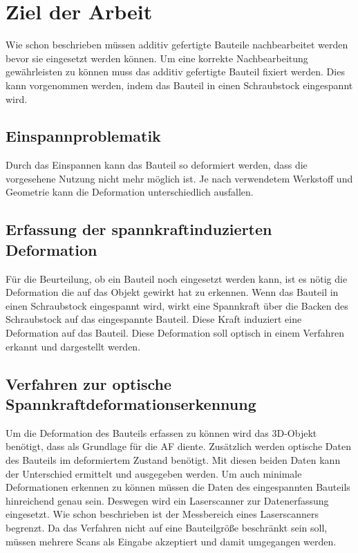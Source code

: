 

\chapter{Ziel der Arbeit}

Wie schon beschrieben müssen additiv gefertigte Bauteile nachbearbeitet werden
bevor sie eingesetzt werden können. 
Um eine korrekte Nachbearbeitung gewährleisten zu können muss das additiv 
gefertigte Bauteil fixiert werden. 
Dies kann vorgenommen werden, indem das Bauteil in einen Schraubstock eingespannt wird.

\section{Einspannproblematik}

Durch das Einspannen kann das Bauteil so deformiert werden, dass die vorgesehene Nutzung nicht mehr möglich ist. 
Je nach verwendetem Werkstoff und Geometrie kann die Deformation unterschiedlich
ausfallen. 

\section{Erfassung der spannkraftinduzierten Deformation}

Für die Beurteilung, ob ein Bauteil noch eingesetzt werden kann, ist es nötig die 
Deformation die auf das Objekt gewirkt hat zu erkennen. Wenn das Bauteil in einen 
Schraubstock eingespannt wird, wirkt eine Spannkraft über die Backen des Schraubstock
auf das eingespannte Bauteil. 
Diese Kraft induziert eine Deformation auf das Bauteil. Diese Deformation soll 
optisch in einem Verfahren erkannt und dargestellt werden.

\section{Verfahren zur optische Spannkraftdeformationserkennung}

Um die Deformation des Bauteils erfassen zu können wird das 3D-Objekt benötigt, 
dass als Grundlage für die AF diente. Zusätzlich werden optische Daten des Bauteils 
im deformiertem Zustand benötigt. Mit diesen beiden Daten kann der Unterschied 
ermittelt und ausgegeben werden.
Um auch minimale Deformationen erkennen zu können müssen die Daten des 
eingespannten Bauteils hinreichend genau sein. Deswegen wird ein Laserscanner zur 
Datenerfassung eingesetzt.
Wie schon beschrieben ist der Messbereich eines Laserscanners begrenzt. Da das 
Verfahren nicht auf eine Bauteilgröße beschränkt sein soll, müssen mehrere Scans als 
Eingabe akzeptiert und damit umgegangen werden.


